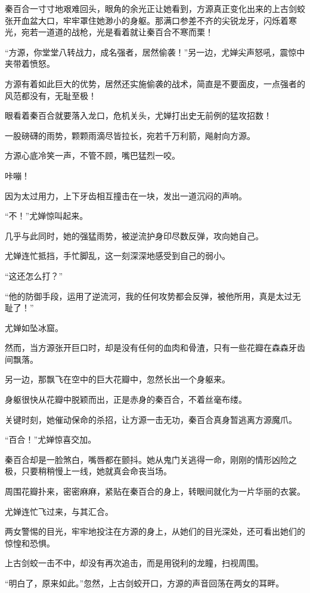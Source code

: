 \begin{this_body}
秦百合一寸寸地艰难回头，眼角的余光正让她看到，方源真正变化出来的上古剑蛟张开血盆大口，牢牢罩住她渺小的身躯。那满口参差不齐的尖锐龙牙，闪烁着寒光，宛若一道道的战枪，光是看着就让秦百合不寒而栗！

“方源，你堂堂八转战力，成名强者，居然偷袭！”另一边，尤婵尖声怒吼，震惊中夹带着愤怒。

方源有着如此巨大的优势，居然还实施偷袭的战术，简直是不要面皮，一点强者的风范都没有，无耻至极！

眼看着秦百合就要落入龙口，危机关头，尤婵打出史无前例的猛攻招数！

一股磅礴的雨势，颗颗雨滴尽皆拉长，宛若千万利箭，飚射向方源。

方源心底冷笑一声，不管不顾，嘴巴猛烈一咬。

咔嘣！

因为太过用力，上下牙齿相互撞击在一块，发出一道沉闷的声响。

“不！”尤婵惊叫起来。

几乎与此同时，她的强猛雨势，被逆流护身印尽数反弹，攻向她自己。

尤婵连忙抵挡，手忙脚乱，这一刻深深地感受到自己的弱小。

“这还怎么打？”

“他的防御手段，运用了逆流河，我的任何攻势都会反弹，被他所用，真是太过无耻了！”

尤婵如坠冰窟。

然而，当方源张开巨口时，却是没有任何的血肉和骨渣，只有一些花瓣在森森牙齿间飘落。

另一边，那飘飞在空中的巨大花瓣中，忽然长出一个身躯来。

身躯很快从花瓣中脱颖而出，正是赤身的秦百合，不着丝毫布缕。

关键时刻，她催动保命的杀招，让方源一击无功，秦百合真身暂逃离方源魔爪。

“百合！”尤婵惊喜交加。

秦百合却是一脸煞白，嘴唇都在颤抖。她从鬼门关逃得一命，刚刚的情形凶险之极，只要稍稍慢上一线，她就真会命丧当场。

周围花瓣扑来，密密麻麻，紧贴在秦百合的身上，转眼间就化为一片华丽的衣裳。

尤婵连忙飞过来，与其汇合。

两女警惕的目光，牢牢地投注在方源的身上，从她们的目光深处，还可看出她们的惊惶和恐惧。

上古剑蛟一击不中，却没有再次追击，而是用锐利的龙瞳，扫视周围。

“明白了，原来如此。”忽然，上古剑蛟开口，方源的声音回荡在两女的耳畔。


\end{this_body}
